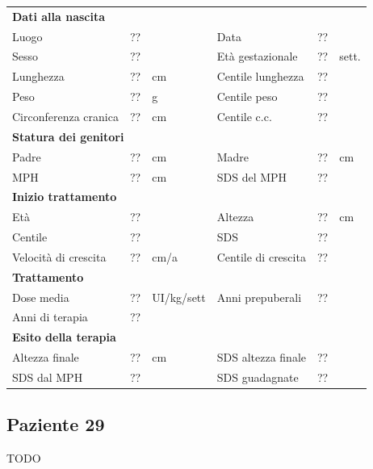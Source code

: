 \begin{table}[!h]
\begin{tabular}{lrllrl}
\toprule
\multicolumn{6}{l}{\textbf{Dati alla nascita}}\\
Luogo 		& \multicolumn{2}{l}{??} 	& Data 					& \multicolumn{2}{l}{??} 	\\
Sesso 		& \multicolumn{2}{l}{??} 	& Età gestazionale 		& ?? 		& sett.\\
Lunghezza 	& ?? 		& cm 				& Centile lunghezza		& ?? 		\\
Peso 		& ?? 		& g					& Centile peso			& ?? 		\\
Circonferenza cranica	& ?? 		& cm 	& Centile c.c.			& ?? \\
\midrule
\multicolumn{6}{l}{\textbf{Statura dei genitori}}\\
Padre 		& ?? & cm 	& Madre 				& ?? & cm \\
MPH 		& ?? & cm 	& SDS del MPH 			& ??\\
\midrule
\multicolumn{6}{l}{\textbf{Inizio trattamento}} \\
Età	& ?? & 		& Altezza 				& ?? & cm  \\
Centile & ?? 	 &		& SDS		& ?? \\
Velocità di crescita & ?? & cm/a	& Centile di crescita & ??\\
\midrule
\multicolumn{6}{l}{\textbf{Trattamento}} \\
Dose media		& ?? & UI/kg/sett & Anni prepuberali & ??\\
Anni di terapia & ??\\
\midrule
\multicolumn{6}{l}{\textbf{Esito della terapia}} \\
Altezza finale			& ?? & cm 	& SDS altezza finale		& ??\\
SDS dal MPH				& ?? &		& SDS guadagnate 			& ??\\
\bottomrule
\end{tabular}
\end{table}
\clearpage


\subsection*{Paziente 29}

TODO

